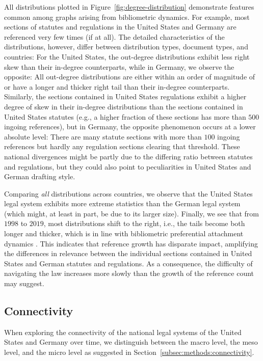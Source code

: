 All distributions plotted in Figure~\ref{fig:degree-distribution} demonstrate features common among graphs arising from bibliometric dynamics. 
For example, most sections of statutes and regulations in the United States and Germany are referenced very few times (if at all). 
The detailed characteristics of the distributions, however, differ between distribution types, document types, and countries:
For the United States, the out-degree distributions exhibit less right skew than their in-degree counterparts, 
while in Germany, we observe the opposite: 
All out-degree distributions are either within an order of magnitude of or have a longer and thicker right tail than their in-degree counterparts. 
Similarly, the sections contained in United States regulations exhibit a higher degree of skew in their in-degree distributions than the sections contained in United States statutes 
(e.g., a higher fraction of these sections has more than $500$ ingoing references), 
but in Germany, the opposite phenomenon occurs at a lower absolute level: 
There are many statute sections with more than $100$ ingoing references but hardly any regulation sections clearing that threshold. 
These national divergences might be partly due to the differing ratio between statutes and regulations, but they could also point to peculiarities in United States and German drafting style.

Comparing \emph{all} distributions across countries, we observe that the United States legal system exhibits more extreme statistics than the German legal system (which might, at least in part, be due to its larger size).
Finally, we see that from $1998$ to $2019$, most distributions shift to the right, i.e., the tails become both longer and thicker, 
which is in line with bibliometric preferential attachment dynamics \cite{merton1968,price1976}.
This indicates that reference growth has disparate impact, amplifying the differences in relevance between the individual sections contained in United States and German statutes and regulations.
As a consequence, the difficulty of navigating the law increases more slowly than the growth of the reference count may suggest. 

\vspace*{12pt}
\subsection{Connectivity}
\label{subsec:results:connectivity}

When exploring the connectivity of the national legal systems of the United States and Germany over time, we distinguish between the macro level, the meso level, and the micro level as suggested in Section~\ref{subsec:methods:connectivity}.

